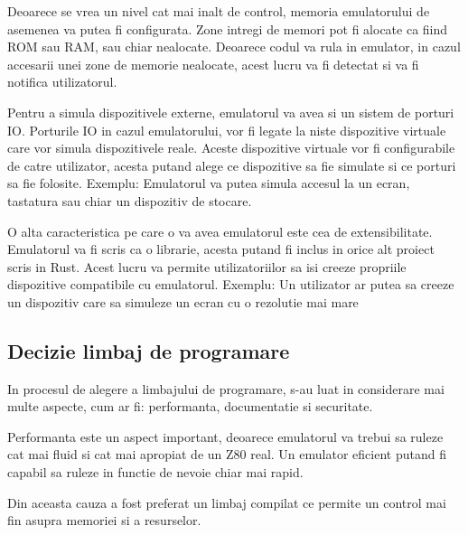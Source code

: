 \documentclass[titlepage,12pt]{article}
\begin{document}
Deoarece se vrea un nivel cat mai inalt de control, memoria emulatorului de asemenea va putea fi configurata.
Zone intregi de memori pot fi alocate ca fiind \ac {ROM} sau \ac {RAM}, sau chiar nealocate.
Deoarece codul va rula in emulator, in cazul accesarii unei zone de memorie nealocate, acest lucru va fi detectat si va fi notifica utilizatorul.

Pentru a simula dispozitivele externe, emulatorul va avea si un sistem de porturi \ac {IO}.
Porturile \ac {IO} in cazul emulatorului, vor fi legate la niste dispozitive virtuale care vor simula dispozitivele reale.
Aceste dispozitive virtuale vor fi configurabile de catre utilizator, acesta putand alege ce dispozitive sa fie simulate si ce porturi sa fie folosite.
Exemplu: Emulatorul va putea simula accesul la un ecran, tastatura sau chiar un dispozitiv de stocare.

O alta caracteristica pe care o va avea emulatorul este cea de extensibilitate.
Emulatorul va fi scris ca o librarie, acesta putand fi inclus in orice alt proiect scris in Rust.
Acest lucru va permite utilizatoriilor sa isi creeze propriile dispozitive compatibile cu emulatorul.
Exemplu: Un utilizator ar putea sa creeze un dispozitiv care sa simuleze un ecran cu o rezolutie mai mare



%

\subsection{Decizie limbaj de programare}

In procesul de alegere a limbajului de programare, s-au luat in considerare mai multe aspecte, cum ar fi:
performanta, documentatie si securitate.

Performanta este un aspect important, deoarece emulatorul va trebui sa ruleze cat mai fluid si cat mai apropiat de un Z80 real.
Un emulator eficient putand fi capabil sa ruleze in functie de nevoie chiar mai rapid.

Din aceasta cauza a fost preferat un limbaj compilat ce permite un control mai fin asupra memoriei si a resurselor.
\end{document}
